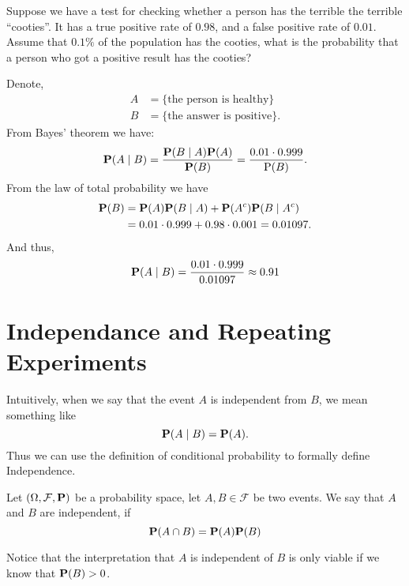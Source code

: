 \documentclass[11pt,a4paper]{article}
\begin{document}
  \begin{example}
    Suppose we have a test for checking whether a person has the terrible 
    the terrible ``cooties''.
    It has a true positive rate of $0.98$, and a false positive rate of
    $0.01$. Assume that $0.1\%$ of the population has the cooties,
    what is the probability that a person who got a positive result
    has the cooties?

    Denote,
    \begin{align*}
      A &= \{\text{the person is healthy}\} \\
      B &= \{\text{the answer is positive}\}.
    \end{align*}
    From Bayes' theorem we have:
    \[
      \mathbf{P}(A \mid B) = 
      {\frac{\mathbf{P}(B \mid A)\mathbf{P}(A)}{\mathbf{P}(B)}} = 
      {\frac{0.01\cdot0.999}{\mathrm{P}(B)}}.
    \]
    From the law of total probability we have
    \begin{align*}
      \mathbf{P}(B) &= 
      \mathbf{P}(A)\mathbf{P}(B \mid A) + 
      \mathbf{P}(A^{c})\mathbf{P}(B \mid A^{c}) \\ &= 
      0.01\cdot0.999+0.98\cdot0.001=0.01097.
    \end{align*}
    And thus,
    \[ \mathbf{P}(A \mid B)={\frac{0.01\cdot0.999}{0.01097}} \approx 0.91 \]
  \end{example}


  \newpage

  \section{Independance and Repeating Experiments}
  Intuitively, when we say that the event $A$ is independent from $B$,
  we mean something like
  \[
    \mathbf{P}(A \mid B) = \mathbf{P}(A).
  \]
  Thus we can use the definition of conditional probability to formally define
  Independence.
  \begin{definition}
    Let $(\Omega, \mathcal F, \mathbf{P})$ be a probability space, let 
    $A,B \in \mathcal F$ be two events. We say that $A$ and $B$ are independent,
    if
    \[
      \mathbf{P}(A \cap B) = \mathbf{P}(A) \mathbf{P}(B)
    \]
  \end{definition}
  Notice that the interpretation that $A$ is independent of $B$ is only viable
  if we know that $\mathbf{P}(B) > 0$.

\end{document}
